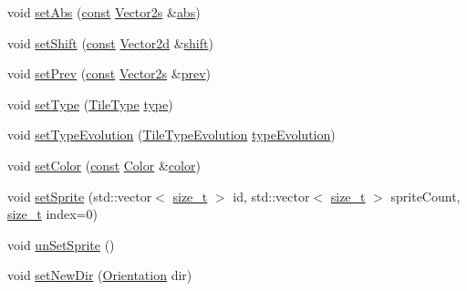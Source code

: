 \begin{DoxyCompactItemize}
\item 
void \hyperlink{classarcade_1_1_entity_a9cad6bddf51b9a9ccf9fe0ef30570719}{set\-Abs} (\hyperlink{term__entry_8h_a57bd63ce7f9a353488880e3de6692d5a}{const} \hyperlink{namespacearcade_a8e527f7400fbff9c38dc31e0a3dd06a1}{Vector2s} \&\hyperlink{classarcade_1_1_entity_a1ac9b04966209d8ce0fb3a80448e4c24}{abs})
\item 
void \hyperlink{classarcade_1_1_entity_a293aa767edc0fb733a2408b09e2ad7be}{set\-Shift} (\hyperlink{term__entry_8h_a57bd63ce7f9a353488880e3de6692d5a}{const} \hyperlink{namespacearcade_ad7fa150bb74a2e66cb4fa04d6fb79e97}{Vector2d} \&\hyperlink{classarcade_1_1_entity_a77dc790cc43e3bac252a91ed54de86a2}{shift})
\item 
void \hyperlink{classarcade_1_1_entity_aaaf6dbefe8fa8f339b126fc8a27bbcb8}{set\-Prev} (\hyperlink{term__entry_8h_a57bd63ce7f9a353488880e3de6692d5a}{const} \hyperlink{namespacearcade_a8e527f7400fbff9c38dc31e0a3dd06a1}{Vector2s} \&\hyperlink{classarcade_1_1_entity_aa85d7facf49ca0a8dac81672be95c5f0}{prev})
\item 
void \hyperlink{classarcade_1_1_entity_abe4f34ae3e985096789348794a38df24}{set\-Type} (\hyperlink{namespacearcade_a61ba576694ea309cdf2b4b66902408ca}{Tile\-Type} \hyperlink{classarcade_1_1_entity_ae7c84a1d8dfb2e2581a745f3743409c5}{type})
\item 
void \hyperlink{classarcade_1_1_entity_a9927bab1649fc06f39df99574a2188bb}{set\-Type\-Evolution} (\hyperlink{namespacearcade_a2e0a64a64203f78c9efb84a1475a8cf4}{Tile\-Type\-Evolution} \hyperlink{classarcade_1_1_entity_a01a2fd9e95413166c79f680995a9cf3a}{type\-Evolution})
\item 
void \hyperlink{classarcade_1_1_entity_a3382c1c787209613cf22ae09b3fb9886}{set\-Color} (\hyperlink{term__entry_8h_a57bd63ce7f9a353488880e3de6692d5a}{const} \hyperlink{unionarcade_1_1_color}{Color} \&\hyperlink{classarcade_1_1_entity_acaa60759203bf9cdeffb2e3303c7e68e}{color})
\item 
void \hyperlink{classarcade_1_1_entity_a6047dc6cc3a6302cfa577e57bc77e1ee}{set\-Sprite} (std\-::vector$<$ \hyperlink{nc__alloc_8h_a7b60c5629e55e8ec87a4547dd4abced4}{size\-\_\-t} $>$ id, std\-::vector$<$ \hyperlink{nc__alloc_8h_a7b60c5629e55e8ec87a4547dd4abced4}{size\-\_\-t} $>$ sprite\-Count, \hyperlink{nc__alloc_8h_a7b60c5629e55e8ec87a4547dd4abced4}{size\-\_\-t} index=0)
\item 
void \hyperlink{classarcade_1_1_entity_aa243f964ec924d7969f0b3d7a3994f56}{un\-Set\-Sprite} ()
\item 
void \hyperlink{classarcade_1_1_entity_ac08e5c8499771d96753596a8e9961ace}{set\-New\-Dir} (\hyperlink{namespacearcade_a370755573a2c68e25c59bedd4bce1342}{Orientation} dir)

\end{DoxyCompactItemize}
